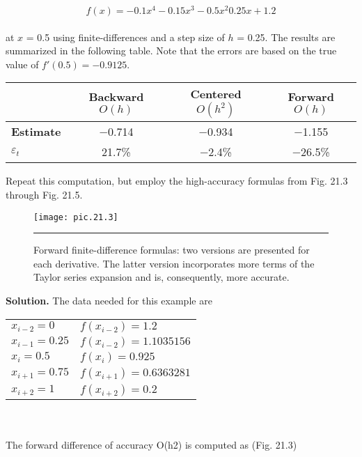\documentclass[../main.tex]{subfiles}
\begin{document}
	$$f(x) = -0.1x^{4} - 0.15x^{3} - 0.5x^{2} 0.25x +1.2$$\\
at $x$ = 0.5 using finite-differences and a step size of $h$ = 0.25. The results are summarized
in the following table. Note that the errors are based on the true value of
$f' (0.5) = −0.9125$.

\begin{table}[hbt!]
\centering
\begin{tabular}{lccc}
\hline
	\vspace{0,1in} & \textbf{Backward $O(h)$} & \textbf{Centered $O(h^{2})$} & \textbf{Forward $O(h)$}\\ \hline
	
	\textbf{Estimate} & −0.714 & −0.934 & −1.155\\
	
	$\varepsilon_{t}$ & 21.7\% & −2.4\% & −26.5\%\\ \hline
\end{tabular}
\end{table}
Repeat this computation, but employ the high-accuracy formulas from Fig. 21.3 through
Fig. 21.5.

\begin{figure}[hbt!]
	\centering
	\texttt{[image: pic.21.3]}
	\caption{\textsf{Forward finite-difference formulas: two versions are presented for each derivative. The latter version
incorporates more terms of the Taylor series expansion and is, consequently, more accurate.}} \hrule
	\label{pic.21.3}
\end{figure}
\vspace{0.2in}
\textbf{Solution.} The data needed for this example are

\begin{tabular}{ll}
	
	$x_{i-2} = 0$ & $f(x_{i-2}) = 1.2$\\
	
	$x_{i-1} = 0.25$ & $f(x_{i-2}) = 1.1035156$\\
	
	$x_{i} = 0.5$ & $f(x_{i}) = 0.925$\\
	
	$x_{i+1} = 0.75$ & $f(x_{i+1}) = 0.6363281$\\
	
	$x_{i+2} = 1$ & $f(x_{i+2}) = 0.2$
\end{tabular}\\
\vspace{0.2in}\\
The forward difference of accuracy O(h2) is computed as (Fig. 21.3)
\end{document}
